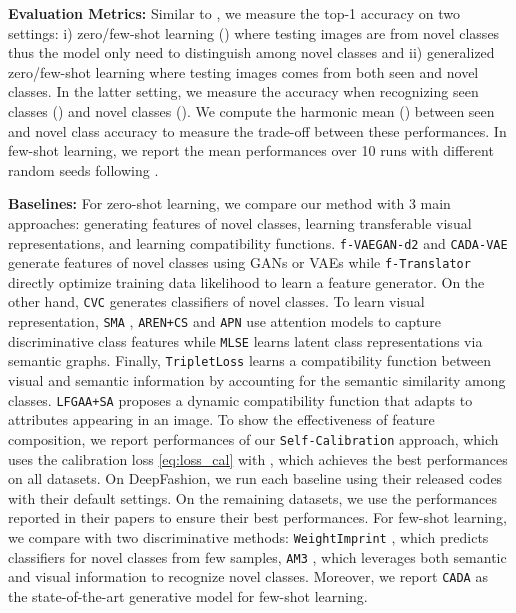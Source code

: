 \documentclass[10pt,journal,compsoc]{IEEEtran}
\newcommand{\1}{\boldsymbol{1}}
\newcommand{\0}{\boldsymbol{0}}
\newcommand{\<}{\langle}
\renewcommand{\>}{\rangle}
\newcommand{\myparagraph}[1]{\vspace{-2pt}\medskip\noindent\textbf{#1}}
\begin{document}
\myparagraph{Evaluation Metrics:}
Similar to \cite{Xian:PAMI18,Schonfeld:CVPR19}, we measure the top-1 accuracy on two settings: i) zero/few-shot learning () where testing images are from novel classes thus the model only need to distinguish among novel classes and ii) generalized zero/few-shot learning where testing images comes from both seen and novel classes. In the latter setting, we measure the accuracy when recognizing seen classes () and novel classes (). We compute the harmonic mean () between seen and novel class accuracy to measure the trade-off between these performances.
In few-shot learning, we report the mean performances over 10 runs with different random seeds following \cite{Schonfeld:CVPR19}.

\myparagraph{Baselines:} 
For zero-shot learning, we compare our method with 3 main approaches: generating features of novel classes, learning transferable visual representations, and learning compatibility functions. \texttt{f-VAEGAN-d2} \cite{Xian:CVPR19} and \texttt{CADA-VAE} \cite{Schonfeld:CVPR19} generate features of novel classes using GANs or VAEs while \texttt{f-Translator} \cite{Zhu:ICCV19} directly optimize training data likelihood to learn a feature generator. On the other hand, \texttt{CVC} \cite{Li:ICCV19} generates classifiers of novel classes.
To learn visual representation, \texttt{SMA} \cite{Yu:NIPS18}, \texttt{AREN+CS} \cite{Xie:CVPR19} and \texttt{APN} \cite{Xu:NeurIPS20} use attention models to capture discriminative class features while \texttt{MLSE} \cite{Ding:CVPR19} learns latent class representations via semantic graphs.
Finally, \texttt{TripletLoss} \cite{Cacheux:ICCV19} learns a compatibility function between visual and semantic information by accounting for the semantic similarity among classes. \texttt{LFGAA+SA} \cite{Liu:ICCV19} proposes a dynamic compatibility function that adapts to attributes appearing in an image.
To show the effectiveness of feature composition, we report performances of our \texttt{Self-Calibration} approach, which uses the calibration loss \eqref{eq:loss_cal} with , which achieves the best performances on all datasets. 
On DeepFashion, we run each baseline using their released codes with their default settings. On the remaining datasets, we use the performances reported in their papers to ensure their best performances.
For few-shot learning, we compare with two discriminative methods: \texttt{WeightImprint} \cite{Qi:CVPR18}, which predicts classifiers for novel classes from few samples, \texttt{AM3} \cite{Xing:NeurIPS19}, which leverages both semantic and visual information to recognize novel classes.
Moreover, we report \texttt{CADA} as the state-of-the-art generative model for few-shot learning.  
\end{document}

